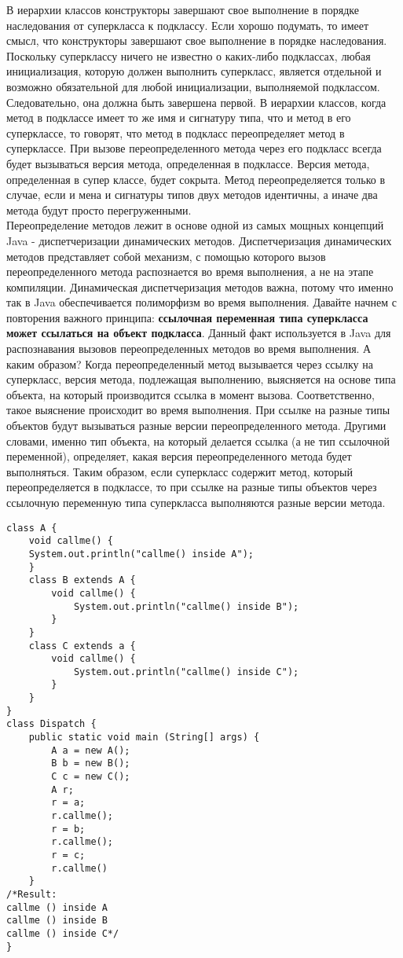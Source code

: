 В  иерархии классов конструкторы завершают свое выполнение в порядке наследования от суперкласса к подклассу. Если хорошо подумать, то имеет смысл, что конструкторы завершают свое выполнение в порядке наследования. Поскольку суперклассу ничего не известно о каких-либо подклассах, любая инициализация, которую должен выполнить суперкласс, является отдельной и возможно обязательной для любой инициализации, выполняемой подклассом. Следовательно, она должна быть завершена первой. В иерархии классов, когда метод в подклассе имеет то же имя и сигнатуру типа, что и метод в его суперклассе, то говорят, что метод в подкласс переопределяет метод в суперклассе. При вызове переопределенного метода через его подкласс всегда будет вызываться версия метода, определенная в подклассе. Версия метода, определенная в супер классе, будет сокрыта. Метод переопределяется только в случае, если и мена и сигнатуры типов двух методов идентичны, а иначе два метода будут просто перегруженными. \\
Переопределение методов лежит в основе одной из самых мощных концепций Java - диспетчеризации динамических методов. Диспетчеризация динамических методов представляет собой механизм, с помощью которого вызов переопределенного метода распознается во время выполнения, а не на этапе компиляции. Динамическая диспетчеризация методов важна, потому что именно так в Java обеспечивается полиморфизм во время выполнения. Давайте начнем с повторения важного принципа: \textbf{ссылочная переменная типа суперкласса может ссылаться на объект подкласса}. Данный факт используется в Java для распознавания вызовов переопределенных методов во время выполнения. А каким образом? Когда переопределенный метод вызывается через ссылку на суперкласс, версия метода, подлежащая выполнению, выясняется на основе типа объекта, на который производится ссылка в момент вызова. Соответственно, такое выяснение происходит во время выполнения. При ссылке на разные типы объектов будут вызываться разные версии переопределенного метода. Другими словами, именно тип объекта, на который делается ссылка (а не тип ссылочной переменной), определяет, какая версия переопределенного метода будет выполняться. Таким образом, если суперкласс содержит метод, который переопределяется в подклассе, то при ссылке на разные типы объектов через ссылочную переменную типа суперкласса выполняются разные версии метода. 
\begin{lstlisting}
class A {
    void callme() {
    System.out.println("callme() inside A");
    }
    class B extends A {
        void callme() {
            System.out.println("callme() inside B");
        }
    }    
    class C extends a {
        void callme() {
            System.out.println("callme() inside C");
        }
    }
}
class Dispatch {
    public static void main (String[] args) {
        A a = new A();
        B b = new B(); 
        C c = new C();
        A r; 
        r = a;
        r.callme();
        r = b; 
        r.callme(); 
        r = c;
        r.callme()
    }
/*Result:
callme () inside A
callme () inside B
callme () inside C*/
}
\end{lstlisting}
